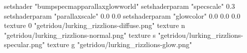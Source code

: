 setshader "bumpspecmapparallaxglowworld"
setshaderparam "specscale" 0.3
setshaderparam "parallaxscale" 0.0 0.0
setshaderparam "glowcolor" 0.0 0.0 0.0
texture 0 "getridou/lurking_rizzlions-diffuse.png"
texture n "getridou/lurking_rizzlions-normal.png"
texture s "getridou/lurking_rizzlions-specular.png"
texture g "getridou/lurking_rizzlions-glow.png"